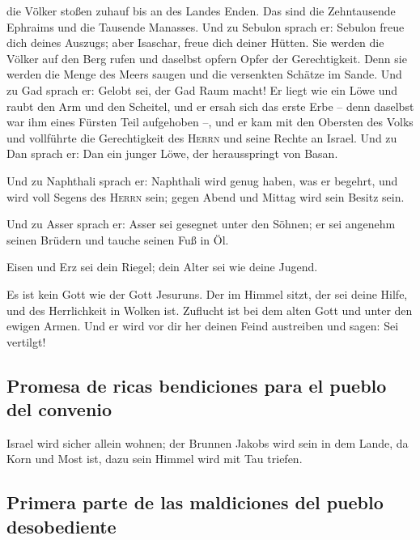 die Völker stoßen zuhauf bis an des Landes Enden. Das sind die
Zehntausende Ephraims und die Tausende Manasses.  Und zu
Sebulon sprach er: Sebulon freue dich deines Auszugs; aber Isaschar,
freue dich deiner Hütten.  Sie werden die Völker auf den
Berg rufen und daselbst opfern Opfer der Gerechtigkeit. Denn sie werden
die Menge des Meers saugen und die versenkten Schätze im Sande.
 Und zu Gad sprach er: Gelobt sei, der Gad Raum macht! Er
liegt wie ein Löwe und raubt den Arm und den Scheitel, 
und er ersah sich das erste Erbe -- denn daselbst war ihm eines Fürsten
Teil aufgehoben --, und er kam mit den Obersten des Volks und vollführte
die Gerechtigkeit des \textsc{Herrn} und seine Rechte an Israel.
 Und zu Dan sprach er: Dan ein junger Löwe, der
herausspringt von Basan.

 Und zu Naphthali sprach er: Naphthali wird genug haben,
was er begehrt, und wird voll Segens des \textsc{Herrn} sein; gegen
Abend und Mittag wird sein Besitz sein.

 Und zu Asser sprach er: Asser sei gesegnet unter den
Söhnen; er sei angenehm seinen Brüdern und tauche seinen Fuß in Öl.

 Eisen und Erz sei dein Riegel; dein Alter sei wie deine
Jugend.

 Es ist kein Gott wie der Gott Jesuruns. Der im Himmel
sitzt, der sei deine Hilfe, und des Herrlichkeit in Wolken ist.
 Zuflucht ist bei dem alten Gott und unter den ewigen
Armen. Und er wird vor dir her deinen Feind austreiben und sagen: Sei
vertilgt!

\hypertarget{promesa-de-ricas-bendiciones-para-el-pueblo-del-convenio}{%
\subsection{Promesa de ricas bendiciones para el pueblo del
convenio}\label{promesa-de-ricas-bendiciones-para-el-pueblo-del-convenio}}

 Israel wird sicher allein wohnen; der Brunnen Jakobs
wird sein in dem Lande, da Korn und Most ist, dazu sein Himmel wird mit
Tau triefen.

\hypertarget{primera-parte-de-las-maldiciones-del-pueblo-desobediente}{%
\subsection{Primera parte de las maldiciones del pueblo
desobediente}\label{primera-parte-de-las-maldiciones-del-pueblo-desobediente}}

